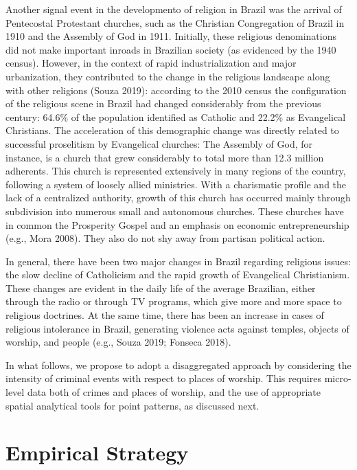 \documentclass[smallextended]{svjour3}       %
\begin{document}
Another signal event in the developmento of religion in Brazil was the
arrival of Pentecostal Protestant churches, such as the Christian
Congregation of Brazil in 1910 and the Assembly of God in 1911.
Initially, these religious denominations did not make important inroads
in Brazilian society (as evidenced by the 1940 census). However, in the
context of rapid industrialization and major urbanization, they
contributed to the change in the religious landscape along with other
religions (Souza 2019): according to the 2010 census the configuration
of the religious scene in Brazil had changed considerably from the
previous century: 64.6\% of the population identified as Catholic and
22.2\% as Evangelical Christians. The acceleration of this demographic
change was directly related to successful proselitism by Evangelical
churches: The Assembly of God, for instance, is a church that grew
considerably to total more than 12.3 million adherents. This church is
represented extensively in many regions of the country, following a
system of loosely allied ministries. With a charismatic profile and the
lack of a centralized authority, growth of this church has occurred
mainly through subdivision into numerous small and autonomous churches.
These churches have in common the Prosperity Gospel and an emphasis on
economic entrepreneurship (e.g., Mora 2008). They also do not shy away
from partisan political action.

In general, there have been two major changes in Brazil regarding
religious issues: the slow decline of Catholicism and the rapid growth
of Evangelical Christianism. These changes are evident in the daily life
of the average Brazilian, either through the radio or through TV
programs, which give more and more space to religious doctrines. At the
same time, there has been an increase in cases of religious intolerance
in Brazil, generating violence acts against temples, objects of worship,
and people (e.g., Souza 2019; Fonseca 2018).

In what follows, we propose to adopt a disaggregated approach by
considering the intensity of criminal events with respect to places of
worship. This requires micro-level data both of crimes and places of
worship, and the use of appropriate spatial analytical tools for point
patterns, as discussed next.

\hypertarget{methods}{%
\section{Empirical Strategy}\label{methods}}
\end{document}
